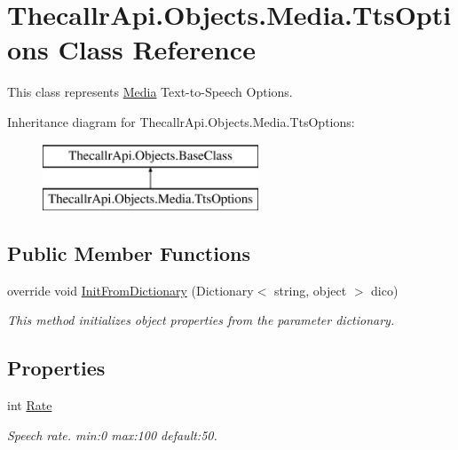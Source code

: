 \hypertarget{class_thecallr_api_1_1_objects_1_1_media_1_1_tts_options}{\section{Thecallr\+Api.\+Objects.\+Media.\+Tts\+Options Class Reference}
\label{class_thecallr_api_1_1_objects_1_1_media_1_1_tts_options}
}


This class represents \hyperlink{namespace_thecallr_api_1_1_objects_1_1_media}{Media} Text-\/to-\/\+Speech Options.  


Inheritance diagram for Thecallr\+Api.\+Objects.\+Media.\+Tts\+Options\+:\begin{figure}[H]
\begin{center}
\leavevmode
\includegraphics[height=2.000000cm]{class_thecallr_api_1_1_objects_1_1_media_1_1_tts_options}
\end{center}
\end{figure}
\subsection*{Public Member Functions}
\begin{DoxyCompactItemize}
\item 
override void \hyperlink{class_thecallr_api_1_1_objects_1_1_media_1_1_tts_options_a8c6d1e02931f86265ef1bdf3bbe9b154}{Init\+From\+Dictionary} (Dictionary$<$ string, object $>$ dico)
\begin{DoxyCompactList}\small\item\em This method initializes object properties from the parameter dictionary. \end{DoxyCompactList}\end{DoxyCompactItemize}
\subsection*{Properties}
\begin{DoxyCompactItemize}
\item 
int \hyperlink{class_thecallr_api_1_1_objects_1_1_media_1_1_tts_options_a81d17f4f948622b47f5e10f8e1c09b85}{Rate}
\begin{DoxyCompactList}\small\item\em Speech rate. min\+:0 max\+:100 default\+:50. \end{DoxyCompactList}\end{DoxyCompactItemize}


